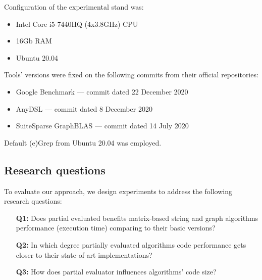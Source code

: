 \documentclass[conference]{IEEEtran}
\begin{document}
Configuration of the experimental stand was:
\begin{itemize}
	\item Intel Core i5-7440HQ (4x3.8GHz) CPU
	\item 16Gb RAM
	\item Ubuntu 20.04
\end{itemize}

Tools' versions were fixed on the following commits from their official repositories:
\begin{itemize}
	\item Google Benchmark --- commit dated 22 December 2020
	\item AnyDSL --- commit dated 8 December 2020
	\item SuiteSparse GraphBLAS --- commit dated 14 July 2020
\end{itemize}

Default (e)Grep from Ubuntu 20.04 was employed.



\subsection{Research questions}

To evaluate our approach, we design experiments to address the following research questions:

\begin{itemize}
	\item[\textbf{Q1:}] Does partial evaluated benefits matrix-based string and graph algorithms performance (execution time) comparing to their basic versions?
	\item[\textbf{Q2:}] In which degree partially evaluated algorithms code performance gets closer to their state-of-art implementations?
	\item[\textbf{Q3:}] How does partial evaluator influences algorithms' code size?
\end{itemize}
\end{document}
